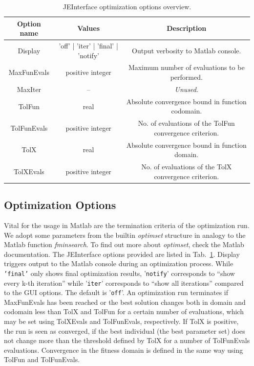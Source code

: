 \begin{table}
\begin{tabular}{|c|c|c|}
\hline 
{\footnotesize Option name} & {\footnotesize Values} & {\footnotesize Description}\tabularnewline
\hline 
\hline 
{\footnotesize Display} & {\footnotesize 'off' | 'iter' | 'final' | 'notify'} & {\footnotesize Output verbosity to Matlab console.}\tabularnewline
{\footnotesize MaxFunEvals} & {\footnotesize positive integer} & {\footnotesize Maximum number of evaluations to be performed.}\tabularnewline
{\footnotesize MaxIter} & {\footnotesize --} & \emph{\footnotesize Unused}{\footnotesize .}\tabularnewline
{\footnotesize TolFun} & {\footnotesize real} & {\footnotesize Absolute convergence bound in function codomain.}\tabularnewline
{\footnotesize TolFunEvals} & {\footnotesize positive integer} & {\footnotesize No. of evaluations of the TolFun convergence criterion.}\tabularnewline
{\footnotesize TolX} & {\footnotesize real} & {\footnotesize Absolute convergence bound in function domain.}\tabularnewline
{\footnotesize TolXEvals} & {\footnotesize positive integer} & {\footnotesize No. of evaluations of the TolX convergence criterion.}\tabularnewline
\hline 
\end{tabular}

\caption{JEInterface optimization options overview.\label{tab:JEInterface-optimization-options.}}
\end{table}



\subsection{Optimization Options}

Vital for the usage in Matlab are the termination criteria of the
optimization run. We adopt some parameters from the builtin \emph{optimset}
structure in analogy to the Matlab function \emph{fminsearch}. To
find out more about \emph{optimset}, check the Matlab documentation.
The JEInterface options provided are listed in Tab.~\ref{tab:JEInterface-optimization-options.}.
Display triggers output to the Matlab console during an optimization
process. While \texttt{'final'} only shows final optimization results,
'\texttt{notify}' corresponds to ``show every k-th iteration'' while
'\texttt{iter}' corresponds to ``show all iterations'' compared
to the GUI options. The default is '\texttt{off}'. An optimization
run terminates if MaxFunEvals has been reached or the best solution
changes both in domain and codomain less than TolX and TolFun for
a certain number of evaluations, which may be set using TolXEvals
and TolFunEvals, respectively. If TolX is positive, the run is seen
as converged, if the best individual (the best parameter set) does
not change more than the threshold defined by TolX for a number of
TolFunEvals evaluations. Convergence in the fitness domain is defined
in the same way using TolFun and TolFunEvals. 

